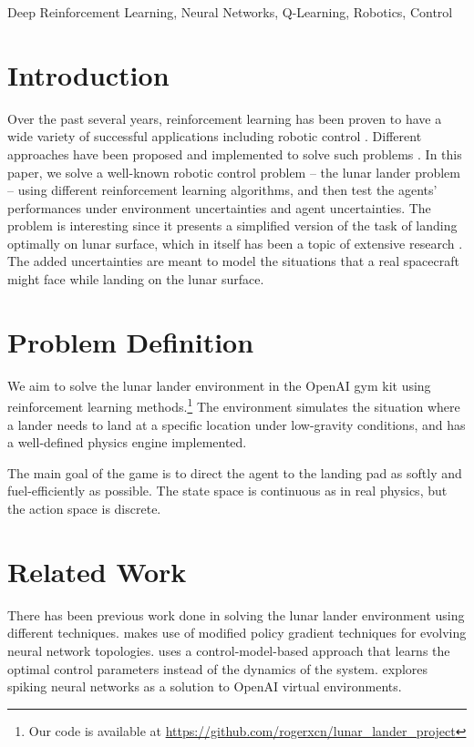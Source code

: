 \documentclass[10pt, conference]{IEEEtran}
\begin{document}
\begin{IEEEkeywords}
Deep Reinforcement Learning, Neural Networks, Q-Learning, Robotics, Control
\end{IEEEkeywords}

\section{Introduction}
Over the past several years, reinforcement learning \cite{sutton2018reinforcement} has been proven to have a wide variety of successful applications including robotic control \cite{kober2013reinforcement, riedmiller2009reinforcement}. Different approaches have been proposed and implemented to solve such problems \cite{kaelbling1996reinforcement, szepesvari2010algorithms}. In this paper, we solve a well-known robotic control problem --  the lunar lander problem -- using different reinforcement learning algorithms, and then test the agents' performances under environment uncertainties and agent uncertainties. The problem is interesting since it presents a simplified version of the task of landing optimally on lunar surface, which in itself has been a topic of extensive research \cite{brady2010challenge, cho2009optimal, liu2008optimal}. The added uncertainties are meant to model the situations that a real spacecraft might face while landing on the lunar surface.

\section{Problem Definition}
We aim to solve the lunar lander environment in the OpenAI gym kit using reinforcement learning methods.\footnote{Our code is available at \url{https://github.com/rogerxcn/lunar_lander_project}} The environment simulates the situation where a lander needs to land at a specific location under low-gravity conditions, and has a well-defined physics engine implemented.

The main goal of the game is to direct the agent to the landing pad as softly and fuel-efficiently as possible. The state space is continuous as in real physics, but the action space is discrete.

\section{Related Work}
There has been previous work done in solving the lunar lander environment using different techniques. \cite{8882916} makes use of modified policy gradient techniques for evolving neural network topologies. \cite{lu2019controlmodelbased} uses a control-model-based approach that learns the optimal control parameters instead of the dynamics of the system. \cite{FLAIRS1918312} explores spiking neural networks as a solution to OpenAI virtual environments. 
\end{document}
